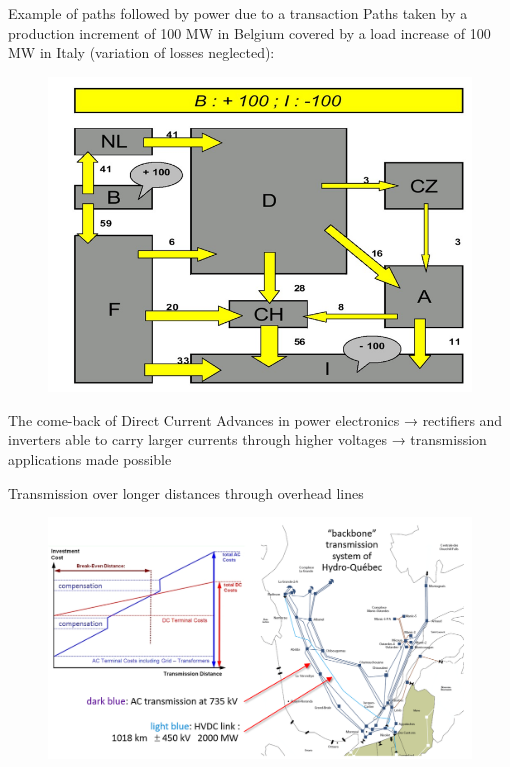 \begin{frame}
{Example of paths followed by power due to a transaction}
Paths taken by a production increment of 100 MW in Belgium
covered by a load increase of 100 MW in Italy (variation of losses neglected):
\begin{figure}
\centering
\includegraphics[width=0.5\linewidth]{images/EU_path_flows.png}
\end{figure}
\end{frame}

\begin{frame}
{The come-back of Direct Current}
Advances in power electronics → rectifiers and inverters able to carry larger currents through higher voltages → transmission applications made possible
\end{frame}

\begin{frame}
{Transmission over longer distances through overhead lines}
\begin{figure}
\centering
\includegraphics[width=0.9\linewidth]{images/DC_line.png}
\end{figure}
\end{frame}

